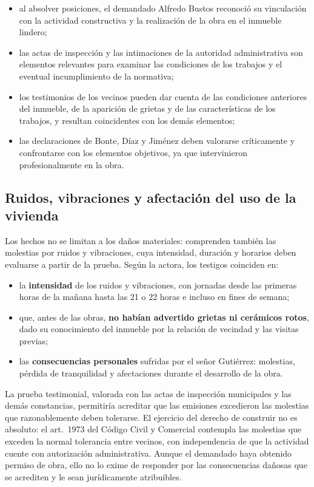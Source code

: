\documentclass[12pt,oneside]{book}
\begin{document}
\begin{itemize}
    \item al absolver posiciones, el demandado Alfredo Bustos reconoci\'o su vinculaci\'on con la actividad constructiva y la realizaci\'on de la obra en el inmueble lindero;
    \item las actas de inspecci\'on y las intimaciones de la autoridad administrativa son elementos relevantes para examinar las condiciones de los trabajos y el eventual incumplimiento de la normativa;
    \item los testimonios de los vecinos pueden dar cuenta de las condiciones anteriores del inmueble, de la aparici\'on de grietas y de las caracter\'isticas de los trabajos, y resultan coincidentes con los dem\'as elementos;
    \item las declaraciones de Bonte, D\'iaz y Jim\'enez deben valorarse cr\'iticamente y confrontarse con los elementos objetivos, ya que intervinieron profesionalmente en la obra.
\end{itemize}

\subsection{Ruidos, vibraciones y afectaci\'on del uso de la vivienda}

Los hechos no se limitan a los da\~nos materiales: comprenden tambi\'en las molestias por ruidos y vibraciones, cuya intensidad, duraci\'on y horarios deben evaluarse a partir de la prueba. Seg\'un la actora, los testigos coinciden en:

\begin{itemize}
    \item la \textbf{intensidad} de los ruidos y vibraciones, con jornadas desde las primeras horas de la ma\~nana hasta las 21 o 22 horas e incluso en fines de semana;
    \item que, antes de las obras, \textbf{no hab\'ian advertido grietas ni cer\'amicos rotos}, dado su conocimiento del inmueble por la relaci\'on de vecindad y las visitas previas;
    \item las \textbf{consecuencias personales} sufridas por el se\~nor Guti\'errez: molestias, p\'erdida de tranquilidad y afectaciones durante el desarrollo de la obra.
\end{itemize}

La prueba testimonial, valorada con las actas de inspecci\'on municipales y las dem\'as constancias, permitir\'ia acreditar que las emisiones excedieron las molestias que razonablemente deben tolerarse. El ejercicio del derecho de construir no es absoluto: el art.~1973 del C\'odigo Civil y Comercial contempla las molestias que exceden la normal tolerancia entre vecinos, con independencia de que la actividad cuente con autorizaci\'on administrativa. Aunque el demandado haya obtenido permiso de obra, ello no lo exime de responder por las consecuencias da\~nosas que se acrediten y le sean jur\'idicamente atribuibles.
\end{document}
